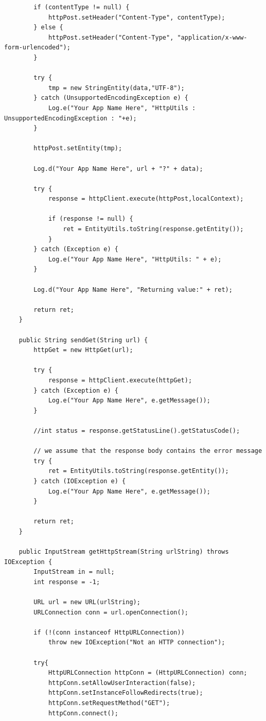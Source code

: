 \documentclass[12pt, %
openright, 
oneside,
a4paper,
brazil]{facom-ufu-abntex2}
\begin{document}
\begin{anexosenv}
\begin{lstlisting}
        if (contentType != null) {
            httpPost.setHeader("Content-Type", contentType);
        } else {
            httpPost.setHeader("Content-Type", "application/x-www-form-urlencoded");
        }

        try {
            tmp = new StringEntity(data,"UTF-8");
        } catch (UnsupportedEncodingException e) {
            Log.e("Your App Name Here", "HttpUtils : UnsupportedEncodingException : "+e);
        }

        httpPost.setEntity(tmp);

        Log.d("Your App Name Here", url + "?" + data);

        try {
            response = httpClient.execute(httpPost,localContext);

            if (response != null) {
                ret = EntityUtils.toString(response.getEntity());
            }
        } catch (Exception e) {
            Log.e("Your App Name Here", "HttpUtils: " + e);
        }

        Log.d("Your App Name Here", "Returning value:" + ret);

        return ret;
    }

    public String sendGet(String url) {
        httpGet = new HttpGet(url);  

        try {
            response = httpClient.execute(httpGet);  
        } catch (Exception e) {
            Log.e("Your App Name Here", e.getMessage());
        }

        //int status = response.getStatusLine().getStatusCode();  

        // we assume that the response body contains the error message  
        try {
            ret = EntityUtils.toString(response.getEntity());  
        } catch (IOException e) {
            Log.e("Your App Name Here", e.getMessage());
        }

        return ret;
    }

    public InputStream getHttpStream(String urlString) throws IOException {
        InputStream in = null;
        int response = -1;

        URL url = new URL(urlString); 
        URLConnection conn = url.openConnection();

        if (!(conn instanceof HttpURLConnection))                     
            throw new IOException("Not an HTTP connection");

        try{
            HttpURLConnection httpConn = (HttpURLConnection) conn;
            httpConn.setAllowUserInteraction(false);
            httpConn.setInstanceFollowRedirects(true);
            httpConn.setRequestMethod("GET");
            httpConn.connect(); 


\end{lstlisting}
\end{anexosenv}
\end{document}

